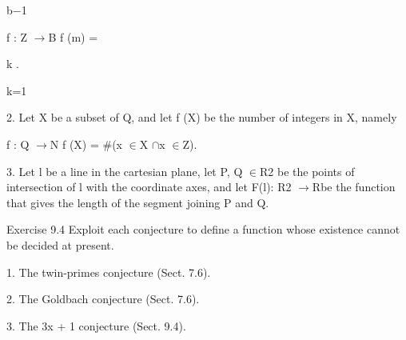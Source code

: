 \documentclass[11pt]{article}
\theoremstyle{plain}
\theoremstyle{definition}
\begin{document}
b$-$1

f : Z $\to$B f (m) =

k .

k=1

2. Let X be a subset of Q, and let f (X) be the number of integers in X, namely

f : Q $\to$N f (X) = \#(x $\in$X $\cap$x $\in$Z).

3. Let l be a line in the cartesian plane, let P, Q $\in$R2 be the points of intersection of l with the coordinate axes, and let F(l): R2 $\to$Rbe the function that gives the length of the segment joining P and Q.

Exercise 9.4 Exploit each conjecture to define a function whose existence cannot be decided at present.

1. The twin-primes conjecture (Sect. 7.6).

2. The Goldbach conjecture (Sect. 7.6).

3. The 3x + 1 conjecture (Sect. 9.4).
\end{document}
